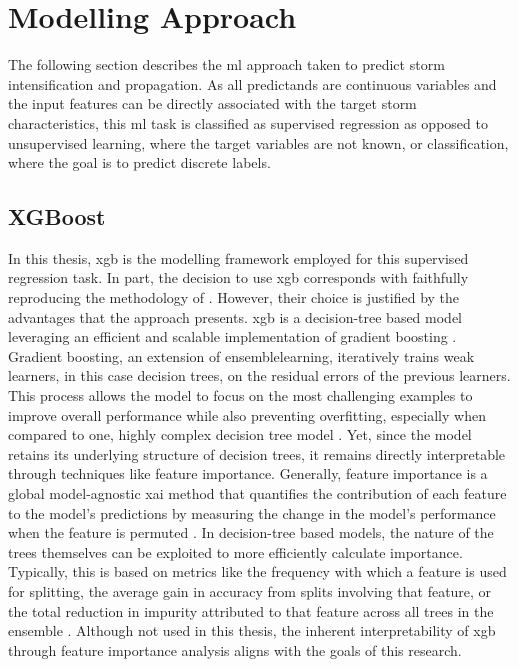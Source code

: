 \section{Modelling Approach}

The following section describes the \acrshort{ml} approach taken to predict storm intensification and propagation. As all predictands are continuous variables and the input features can be directly associated with the target storm characteristics, this \acrshort{ml} task is classified as supervised regression as opposed to unsupervised learning, where the target variables are not known, or classification, where the goal is to predict discrete labels.

\subsection{XGBoost}

In this thesis, \acrfull{xgb} is the modelling framework employed for this supervised regression task. In part, the decision to use \acrshort{xgb} corresponds with faithfully reproducing the methodology of \cite{Hunt2024}. However, their choice is justified by the advantages that the approach presents. \acrshort{xgb} is a decision-tree based model leveraging an efficient and scalable implementation of gradient boosting \citep{Chen2016}. Gradient boosting, an extension of \gls{ensemblelearning}, iteratively trains weak learners, in this case decision trees, on the residual errors of the previous learners. This process allows the model to focus on the most challenging examples to improve overall performance while also preventing overfitting, especially when compared to one, highly complex decision tree model \citep{Friedman2001}. Yet, since the model retains its underlying structure of decision trees, it remains directly interpretable through techniques like feature importance. Generally, feature importance is a global model-agnostic \acrshort{xai} method that quantifies the contribution of each feature to the model's predictions by measuring the change in the model's performance when the feature is permuted \citep{Musolf2022}. In decision-tree based models, the nature of the trees themselves can be exploited to more efficiently calculate importance. Typically, this is based on metrics like the frequency with which a feature is used for splitting, the average gain in accuracy from splits involving that feature, or the total reduction in impurity attributed to that feature across all trees in the ensemble \citep{Louppe2013}. Although not used in this thesis, the inherent interpretability of \acrshort{xgb} through feature importance analysis aligns with the goals of this research.

